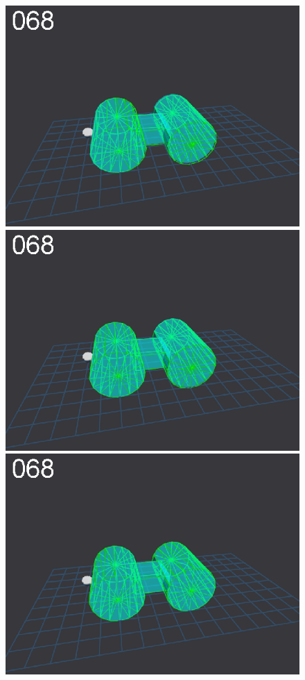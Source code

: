 \begin{figure}[tbp]
{\includegraphics[width=\imgCXwid]{images/C5_1exp_6_1}
\includegraphics[width=\imgCXwid]{images/C5_2exp_6_1}
\includegraphics[width=\imgCXwid]{images/C5_3exp_6_1}
}
\end{figure}
